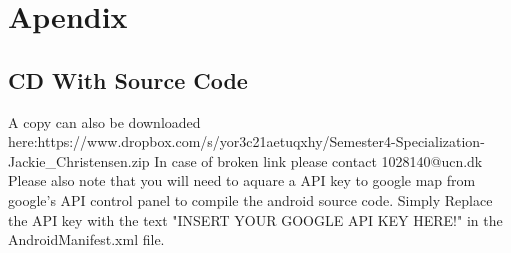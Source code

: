 \chapter*{Apendix}
\section*{CD With Source Code}

A copy can also be downloaded here:\newline https://www.dropbox.com/s/yor3c21aetuqxhy/Semester4-\linebreak Specialization-Jackie\_Christensen.zip
\newline
\newline
In case of broken link please contact 1028140@ucn.dk
\newline
\newline
\newline
Please also note that you will need to aquare a API key to google map from google's API control panel to compile the android source code. Simply Replace the API key with the text "INSERT YOUR GOOGLE API KEY HERE!" in the AndroidManifest.xml file.